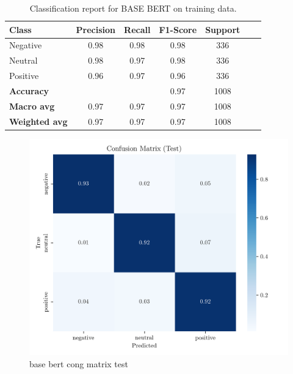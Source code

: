 \documentclass[conference]{IEEEtran}
\begin{document}
\begin{table}[H]
\centering
\caption{Classification report for BASE BERT on training data.}
\label{cr_basebert_train}
\begin{tabular}{lcccccc}
\toprule
\textbf{Class} & \textbf{Precision} & \textbf{Recall} & \textbf{F1-Score} & \textbf{Support} \\
\midrule
Negative & 0.98 & 0.98 & 0.98 & 336 \\
Neutral & 0.98 & 0.97 & 0.98 & 336 \\
Positive & 0.96 & 0.97 & 0.96 & 336 \\
\midrule
\textbf{Accuracy} &  &  & 0.97 & 1008 \\
\textbf{Macro avg} & 0.97 & 0.97 & 0.97 & 1008 \\
\textbf{Weighted avg} & 0.97 & 0.97 & 0.97 & 1008 \\
\bottomrule
\end{tabular}
\end{table}

\begin{figure}[H]
    \centering
    \includegraphics[width=1\linewidth]{assets/base_bert_confusion_matrix_Test.png}
    \caption{base bert cong matrix test}
    \label{fig:base_bert_confusion_matrix_Test}
\end{figure}
\end{document}
